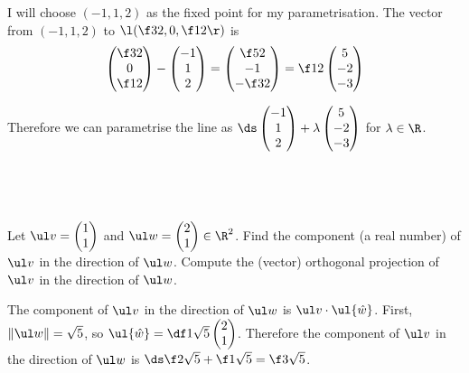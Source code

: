\documentclass[a4paper]{article}
\begin{document}
I will choose $(-1, 1, 2)$ as the fixed point for my parametrisation. The vector from $(-1, 1, 2)$ to $\l( \f32, 0, \f12 \r)$ is \[
\begin{pmatrix}\f32 \\ 0 \\ \f12\end{pmatrix}
- \begin{pmatrix}-1 \\ 1 \\ 2\end{pmatrix}
= \begin{pmatrix}\f52 \\ -1 \\ -\f32\end{pmatrix}
= \f12 \begin{pmatrix}5 \\ -2 \\ -3\end{pmatrix}
\]

Therefore we can parametrise the line as $\ds\begin{pmatrix}-1 \\ 1 \\ 2\end{pmatrix} + \lambda \begin{pmatrix}5 \\ -2 \\ -3\end{pmatrix}$ for $\lambda \in \R$.


\subsection{~} %

\begin{questionbody}
Let $\ul v = \begin{pmatrix}1 \\ 1\end{pmatrix}$ and $\ul w = \begin{pmatrix}2 \\ 1\end{pmatrix} \in \R^2$. Find the component (a real number) of $\ul v$ in the direction of $\ul w$. Compute the (vector) orthogonal projection of $\ul v$ in the direction of $\ul w$.
\end{questionbody}

The component of $\ul v$ in the direction of $\ul w$ is $\ul v \cdot \ul{\hat w}$. First, $\|\ul w\| = \sqrt5$, so $\ul{\hat w} = \df1{\sqrt5} \begin{pmatrix}2 \\ 1\end{pmatrix}$. Therefore the component of $\ul v$ in the direction of $\ul w$ is $\ds \f2{\sqrt5} + \f1{\sqrt5} = \f3{\sqrt5}$.
\end{document}
